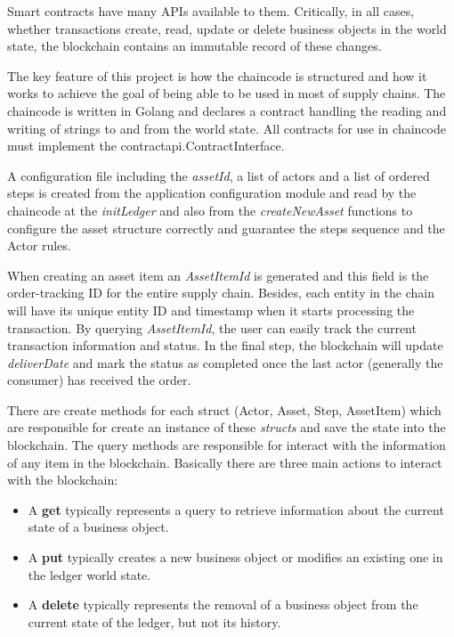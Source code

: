Smart contracts have many APIs available to them. Critically, in all cases, whether transactions create, read, update or delete business objects in the world state, the blockchain contains an immutable record of these changes.

The key feature of this project is how the chaincode is structured and how it works to achieve the goal of being able to be used in most of supply chains. The chaincode is written in Golang and declares a contract handling the reading and writing of strings to and from the world state. All contracts for use in chaincode must implement the contractapi.ContractInterface. 

A configuration file including the \textit{assetId}, a list of actors and a list of ordered steps is created from the application configuration module and read by the chaincode at the \textit{initLedger} and also from the \textit{createNewAsset} functions to configure the asset structure correctly and guarantee the steps sequence and the Actor rules.

When creating an asset item an \textit{AssetItemId} is generated and this field is the order-tracking ID for the entire supply chain. Besides, each entity in the chain will have its unique entity ID and timestamp when it starts processing the transaction. By querying \textit{AssetItemId}, the user can easily track the current transaction information and status. In the final step, the blockchain will update \textit{deliverDate} and mark the status as completed once the last actor (generally the consumer) has received the order.

There are create methods for each struct (Actor, Asset, Step, AssetItem) which are responsible for create an instance of these \textit{structs} and save the state into the blockchain. The query methods are responsible for interact with the information of any item in the blockchain. Basically there are three main actions to interact with the blockchain: 

\begin{itemize}
\item A \textbf{get} typically represents a query to retrieve information about the current state of a business object.
\item A \textbf{put} typically creates a new business object or modifies an existing one in the ledger world state.
\item A \textbf{delete} typically represents the removal of a business object from the current state of the ledger, but not its history.
\end{itemize}

